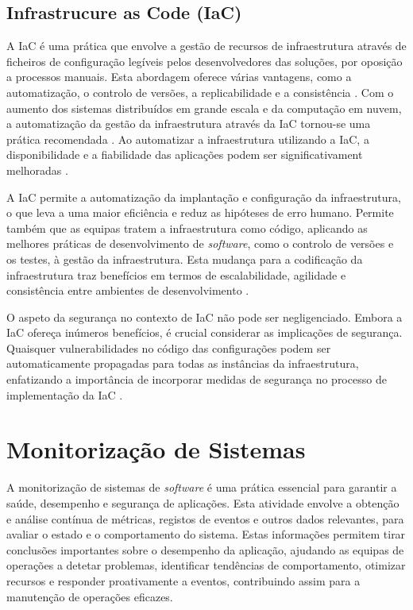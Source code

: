 \subsection{Infrastrucure as Code (IaC)}

A \ac{IaC} é uma prática que envolve a gestão de recursos de infraestrutura através de ficheiros 
de configuração legíveis pelos desenvolvedores das soluções, por oposição a processos manuais. Esta 
abordagem oferece várias vantagens, como a automatização, o controlo de versões, a replicabilidade 
e a consistência \cite{iac2023}. Com o aumento dos sistemas distribuídos em grande escala 
e da computação em nuvem, a automatização da gestão da infraestrutura através da \ac{IaC} 
tornou-se uma prática recomendada \cite{iac2016}. Ao automatizar a infraestrutura utilizando a 
\ac{IaC}, a disponibilidade e a fiabilidade das aplicações podem ser significativament melhoradas 
\cite{iac2022}.

A \ac{IaC} permite a automatização da implantação e configuração da infraestrutura, o que leva a 
uma maior eficiência e reduz as hipóteses de erro humano. Permite também que as equipas tratem a 
infraestrutura como código, aplicando as melhores práticas de desenvolvimento de \textit{software}, 
como o controlo de versões e os testes, à gestão da infraestrutura. Esta mudança para a codificação 
da infraestrutura traz benefícios em termos de escalabilidade, agilidade e consistência entre 
ambientes de desenvolvimento \cite{iac2023b}.

O aspeto da segurança no contexto de \ac{IaC} não pode ser negligenciado. Embora a \ac{IaC} 
ofereça inúmeros benefícios, é crucial considerar as implicações de segurança. Quaisquer 
vulnerabilidades no código das configurações podem ser automaticamente propagadas para todas as 
instâncias da infraestrutura, enfatizando a importância de incorporar medidas de segurança no 
processo de implementação da \ac{IaC} \cite{iac2023}.

\section{Monitorização de Sistemas}

A monitorização de sistemas de \textit{software} é uma prática essencial para garantir a saúde, 
desempenho e segurança de aplicações. Esta atividade envolve a obtenção e análise contínua de métricas, 
registos de eventos e outros dados relevantes, para avaliar o estado e o comportamento 
do sistema. Estas informações permitem tirar conclusões importantes sobre o desempenho da aplicação, 
ajudando as equipas de operações a detetar problemas, identificar tendências de comportamento, 
otimizar recursos e responder proativamente a eventos, contribuindo assim para a manutenção de 
operações eficazes.

